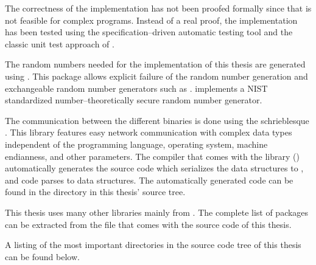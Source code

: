 
The correctness of the implementation has not been proofed formally since that
is not feasible for complex programs. Instead of a real proof, the
implementation has been tested using the specification--driven automatic
\JWThaskell{} testing tool \JWTquickcheck{} \cite{quickcheck} and the classic
unit test approach of \JWTLhunit{}.



The random numbers needed for the implementation of this thesis are generated
using \JWTLmonadcryptorandom{}. This package allows explicit failure of the
random number generation and exchangeable random number generators such as
\JWTLdrbg{}. \JWTdrbg{} implements a NIST standardized number--theoretically
secure random number generator.


\label{sec:net-comm}

The communication between the different binaries is done using the
schrie\-bl\-esque \JWTXLprotobuf{}. This library features easy network
communication with complex data types independent of the programming language,
operating system, machine endianness, and other parameters. The \JWThaskell{}
\JWTprotobuf{} compiler \JWThprotoc{} that comes with the \JWThaskell{}
\JWTprotobuf{} library (\JWTprotobufLib{}) automatically generates the
\JWThaskell{} source code which serializes the data structures to
\JWTprotobuf{}, and code parses \JWTprotobuf{} to \JWThaskell{} data
structures. The automatically generated code can be found in the directory
 in this thesis' source tree.



This thesis uses many other libraries mainly from \JWTLhackage{}. The
complete list of packages can be extracted from the file
 that comes with the source code of this thesis.


\label{sec:src-org}

A listing of the most important directories in the source code tree of this
thesis can be found below.

